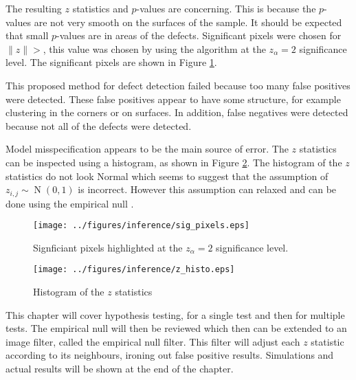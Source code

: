 \documentclass[12pt, a4paper]{memoir}
\DeclareMathOperator{\normal}{N}
\begin{document}
The resulting $z$ statistics and $p$-values are concerning. This is because the $p$-values are not very smooth on the surfaces of the sample. It should be expected that small $p$-values are in areas of the defects. Significant pixels were chosen for $\|z\|>$, this value was chosen by using the \cite{benjamini1995controlling} algorithm at the $z_\alpha = 2$ significance level. The significant pixels are shown in Figure \ref{fig:sig_pixels}.

This proposed method for defect detection failed because too many false positives were detected. These false positives appear to have some structure, for example clustering in the corners or on surfaces. In addition, false negatives were detected because not all of the defects were detected.

Model misspecification appears to be the main source of error. The $z$ statistics can be inspected using a histogram, as shown in Figure \ref{fig:z_histo}. The histogram of the $z$ statistics do not look Normal which seems to suggest that the assumption of $z_{i,j}\sim \normal(0,1)$ is incorrect. However this assumption can relaxed and can be done using the empirical null \citep{efron2004large}.

\begin{figure}
    \centering
    \texttt{[image: ../figures/inference/sig\_pixels.eps]}
    \caption{Signficiant pixels highlighted at the $z_\alpha = 2$ significance level.}
    \label{fig:sig_pixels}
\end{figure}

\begin{figure}
    \centering
    \texttt{[image: ../figures/inference/z\_histo.eps]}
    \caption{Histogram of the $z$ statistics}
    \label{fig:z_histo}
\end{figure}

This chapter will cover hypothesis testing, for a single test and then for multiple tests. The empirical null will then be reviewed which then can be extended to an image filter, called the empirical null filter. This filter will adjust each $z$ statistic according to its neighbours, ironing out false positive results. Simulations and actual results will be shown at the end of the chapter.



\end{document}
